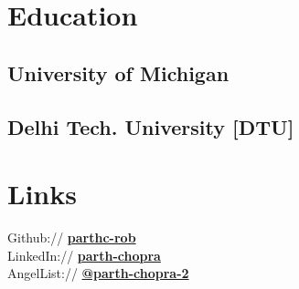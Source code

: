 \documentclass[letterpaper]{deedy-resume} %
\begin{document}
\begin{minipage}[t]{0.25\textwidth} %


\section{Education} 

\subsection{University of Michigan }

\sectionspace %

\subsection{Delhi Tech. University [DTU]}


\sectionspace %






\section{Links} 

Github:// \href{https://github.com/parthc-rob}{\bf parthc-rob} \\
LinkedIn:// \href{https://www.linkedin.com/in/parth-chopra-b7414068}{\bf parth-chopra} \\
AngelList:// \href{https://angel.co/parth-chopra-2}{\bf @parth-chopra-2} \\


\end{minipage}
\end{document}
